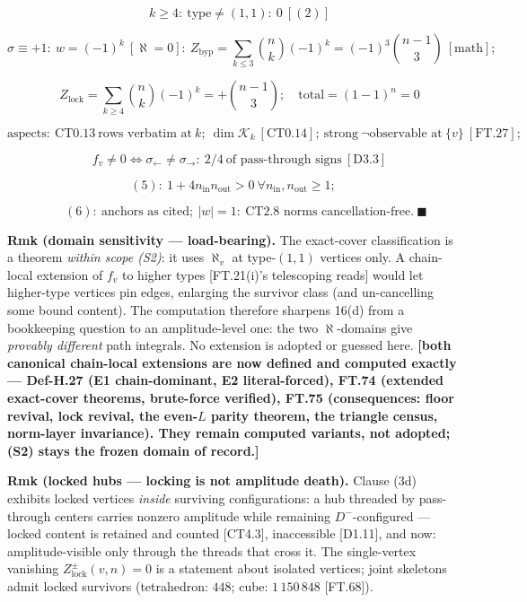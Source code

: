 \begin{theorem}
\[
\quad k\ge4:\ \text{type}\ne(1,1):\ 0\ [(2)]
\]

\[
\sigma\equiv+1:\ w=(-1)^k\ [\aleph=0]:\ Z_{\mathrm{byp}}=\textstyle\sum_{k\le3}\binom nk(-1)^k=(-1)^3\binom{n-1}3\ [\text{math}];
\]

\[
\quad Z_{\mathrm{lock}}=\textstyle\sum_{k\ge4}\binom nk(-1)^k=+\binom{n-1}3;\quad\text{total}=(1-1)^n=0
\]

\[
\text{aspects}:\ \mathrm{CT0.13}\ \text{rows verbatim at}\ k;\ \dim\mathcal K_k\ [\mathrm{CT0.14}];\ \text{strong}\ \neg\text{observable at}\ \{v\}\ [\mathrm{FT.27}];
\]

\[
\quad f_v\ne0\iff\sigma_\leftarrow\ne\sigma_\rightarrow:\ 2/4\ \text{of pass-through signs}\ [\mathrm{D3.3}]
\]

\[
(5):\ 1+4n_{\mathrm{in}}n_{\mathrm{out}}>0\ \forall n_{\mathrm{in}},n_{\mathrm{out}}\ge1;
\]

\[
\qquad (6):\ \text{anchors as cited};\ |w|=1:\ \text{CT2.8 norms cancellation-free}.\ \blacksquare
\]

\textbf{Rmk (domain sensitivity — load-bearing).} The exact-cover classification is a theorem \textit{within scope (S2)}: it uses $\aleph_v$ at type-$(1,1)$ vertices only. A chain-local extension of $f_v$ to higher types [FT.21(i)'s telescoping reads] would let higher-type vertices pin edges, enlarging the survivor class (and un-cancelling some bound content). The computation therefore sharpens 16(d) from a bookkeeping question to an amplitude-level one: the two $\aleph$-domains give \textit{provably different} path integrals. No extension is adopted or guessed here. \textbf{[both canonical chain-local extensions are now defined and computed exactly — Def-H.27 (E1 chain-dominant, E2 literal-forced), FT.74 (extended exact-cover theorems, brute-force verified), FT.75 (consequences: floor revival, lock revival, the even-$L$ parity theorem, the triangle census, norm-layer invariance). They remain computed variants, not adopted; (S2) stays the frozen domain of record.]}

\textbf{Rmk (locked hubs — locking is not amplitude death).} Clause (3d) exhibits locked vertices \textit{inside} surviving configurations: a hub threaded by pass-through centers carries nonzero amplitude while remaining $D^-$-configured — locked content is retained and counted [CT4.3], inaccessible [D1.11], and now: amplitude-visible only through the threads that cross it. The single-vertex vanishing $Z^{\pm}_{\mathrm{lock}}(v,n)=0$ is a statement about isolated vertices; joint skeletons admit locked survivors (tetrahedron: $448$; cube: $1\,150\,848$ [FT.68]).


\end{theorem}
